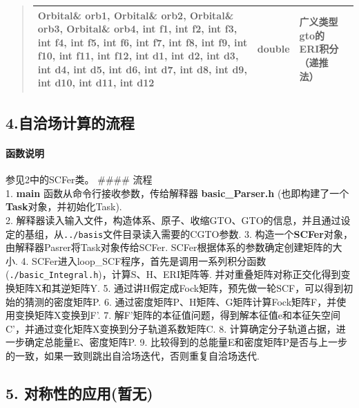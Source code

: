 \documentclass[11pt]{article}
\begin{document}
\begin{quote}
\begin{longtable}[]{@{}llll@{}}
\begin{minipage}[t]{0.37\columnwidth}
Orbital\& orb1, Orbital\& orb2, Orbital\& orb3, Orbital\& orb4, int f1,
int f2, int f3, int f4, int f5, int f6, int f7, int f8, int f9, int f10,
int f11, int f12, int d1, int d2, int d3, int d4, int d5, int d6, int
d7, int d8, int d9, int d10, int d11, int d12\strut
\end{minipage} & \begin{minipage}[t]{0.07\columnwidth}\raggedright\strut
double\strut
\end{minipage} & \begin{minipage}[t]{0.27\columnwidth}\raggedright\strut
广义类型gto的ERI积分（递推法）\strut
\end{minipage}\tabularnewline
\bottomrule
\end{longtable}
\end{quote}

    \subsection{4.自洽场计算的流程}\label{ux81eaux6d3dux573aux8ba1ux7b97ux7684ux6d41ux7a0b}

    \paragraph{函数说明}\label{ux51fdux6570ux8bf4ux660e}

参见2中的SCFer类。 \#\#\#\# 流程\\
1. \textbf{main} 函数从命令行接收参数，传给解释器
\textbf{basic\_Parser.h}
(也即构建了一个\textbf{Task}对象，并初始化Task).\\
2.
解释器读入输入文件，构造体系、原子、收缩GTO、GTO的信息，并且通过设定的基组，从\texttt{../basis}文件目录读入需要的CGTO参数.
3. 构造一个\textbf{SCFer}对象，由解释器Pasrer将Task对象传给SCFer.
SCFer根据体系的参数确定创建矩阵的大小. 4.
SCFer进入loop\_SCF程序，首先是调用一系列积分函数(\texttt{./basic\_Integral.h})，计算S、H、ERI矩阵等.
并对重叠矩阵对称正交化得到变换矩阵X和其逆矩阵Y. 5.
通过讲H假定成Fock矩阵，预先做一轮SCF，可以得到初始的猜测的密度矩阵P. 6.
通过密度矩阵P、H矩阵、G矩阵计算Fock矩阵F，并使用变换矩阵X变换到F'. 7.
解F'矩阵的本征值问题，得到解本征值e和本征矢空间C'，并通过变化矩阵X变换到分子轨道系数矩阵C.
8. 计算确定分子轨道占据，进一步确定总能量E、密度矩阵P. 9.
比较得到的总能量E和密度矩阵P是否与上一步的一致，如果一致则跳出自洽场迭代，否则重复自洽场迭代.

    \subsection{5.
对称性的应用(暂无)}\label{ux5bf9ux79f0ux6027ux7684ux5e94ux7528ux6682ux65e0}
\end{document}
